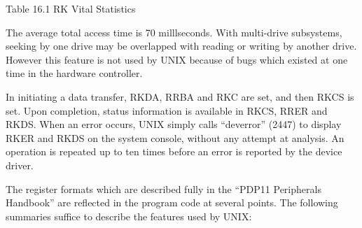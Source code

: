 \begin{center}
 Table 16.1 RK Vital Statistics
\end{center}

The average total access time is 70
milllseconds. With multi-drive subsystems,
seeking by one drive may be overlapped with reading or writing by
another drive. However this feature is
not used by UNIX because of bugs which
existed at one time in the hardware
controller.


In initiating a data transfer, RKDA,
RRBA and RKC are set, and then RKCS is
set. Upon completion, status information is available in RKCS, RRER and
RKDS. When an error occurs, UNIX simply
calls ``deverror'' (2447) to display RKER
and RKDS on the system console, without
any attempt at analysis. An operation
is repeated up to ten times before an
error is reported by the device driver.


The register formats which are
described fully in the ``PDP11 Peripherals Handbook'' are reflected in the
program code at several points. The
following summaries suffice to describe
the features used by UNIX:

